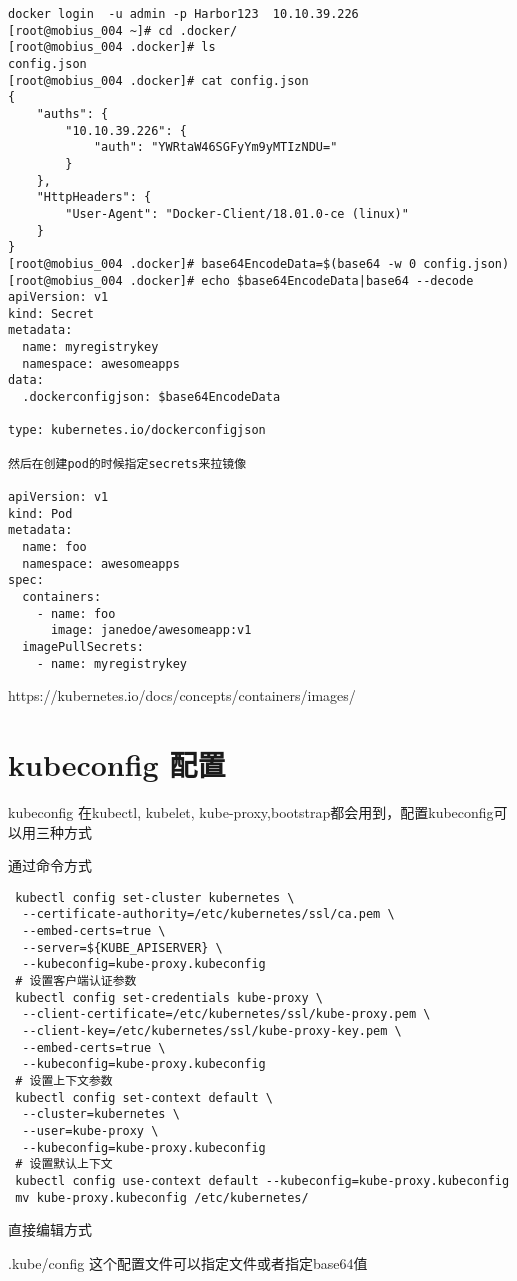 \begin{lstlisting}
docker login  -u admin -p Harbor123  10.10.39.226
[root@mobius_004 ~]# cd .docker/
[root@mobius_004 .docker]# ls
config.json
[root@mobius_004 .docker]# cat config.json
{
	"auths": {
		"10.10.39.226": {
			"auth": "YWRtaW46SGFyYm9yMTIzNDU="
		}
	},
	"HttpHeaders": {
		"User-Agent": "Docker-Client/18.01.0-ce (linux)"
	}
}
[root@mobius_004 .docker]# base64EncodeData=$(base64 -w 0 config.json)
[root@mobius_004 .docker]# echo $base64EncodeData|base64 --decode
apiVersion: v1
kind: Secret
metadata:
  name: myregistrykey
  namespace: awesomeapps
data:
  .dockerconfigjson: $base64EncodeData

type: kubernetes.io/dockerconfigjson

然后在创建pod的时候指定secrets来拉镜像

apiVersion: v1
kind: Pod
metadata:
  name: foo
  namespace: awesomeapps
spec:
  containers:
    - name: foo
      image: janedoe/awesomeapp:v1
  imagePullSecrets:
    - name: myregistrykey

\end{lstlisting}

https://kubernetes.io/docs/concepts/containers/images/

\section{kubeconfig 配置}

kubeconfig 在kubectl, kubelet, kube-proxy,bootstrap都会用到，配置kubeconfig可以用三种方式

通过命令方式

\begin{lstlisting}
 kubectl config set-cluster kubernetes \
  --certificate-authority=/etc/kubernetes/ssl/ca.pem \
  --embed-certs=true \
  --server=${KUBE_APISERVER} \
  --kubeconfig=kube-proxy.kubeconfig
 # 设置客户端认证参数
 kubectl config set-credentials kube-proxy \
  --client-certificate=/etc/kubernetes/ssl/kube-proxy.pem \
  --client-key=/etc/kubernetes/ssl/kube-proxy-key.pem \
  --embed-certs=true \
  --kubeconfig=kube-proxy.kubeconfig
 # 设置上下文参数
 kubectl config set-context default \
  --cluster=kubernetes \
  --user=kube-proxy \
  --kubeconfig=kube-proxy.kubeconfig
 # 设置默认上下文
 kubectl config use-context default --kubeconfig=kube-proxy.kubeconfig
 mv kube-proxy.kubeconfig /etc/kubernetes/
\end{lstlisting}

直接编辑方式

.kube/config 这个配置文件可以指定文件或者指定base64值


